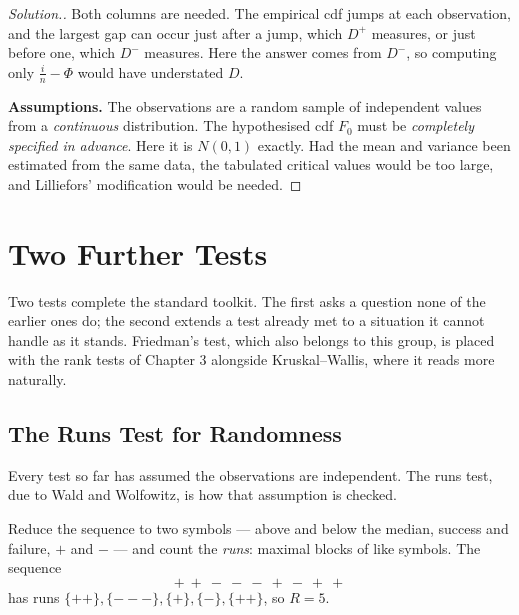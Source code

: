 \documentclass[11pt,a4paper]{article}
\theoremstyle{definition}
\newenvironment{solution}
  {\renewcommand{\qedsymbol}{}\begin{proof}[\textit{Solution}.]}
  {\end{proof}}
\begin{document}
\begin{solution}
Both columns are needed. The empirical cdf jumps at each observation, and the largest gap
can occur just after a jump, which $D^{+}$ measures, or just before one, which $D^{-}$
measures. Here the answer comes from $D^{-}$, so computing only $\frac{i}{n}-\Phi$ would
have understated $D$.

\textbf{Assumptions.} The observations are a random sample of independent values from
a \emph{continuous} distribution. The hypothesised cdf $F_0$ must be \emph{completely
specified in advance}. Here it is $N(0,1)$ exactly. Had the mean and variance been
estimated from the same data, the tabulated critical values would be too large, and
Lilliefors' modification would be needed.
\end{solution}


\section{Two Further Tests}

Two tests complete the standard toolkit. The first asks a question none of the
earlier ones do; the second extends a test already met to a situation it cannot
handle as it stands. Friedman's test, which also belongs to this group, is placed
with the rank tests of Chapter 3 alongside Kruskal--Wallis, where it reads more
naturally.

\subsection{The Runs Test for Randomness}

Every test so far has assumed the observations are independent. The runs test,
due to Wald and Wolfowitz, is how that assumption is checked.

Reduce the sequence to two symbols --- above and below the median, success and
failure, $+$ and $-$ --- and count the \emph{runs}: maximal blocks of like symbols.
The sequence
$$+\ +\ -\ -\ -\ +\ -\ +\ +$$
has runs $\{++\}, \{---\}, \{+\}, \{-\}, \{++\}$, so $R = 5$.
\end{document}

